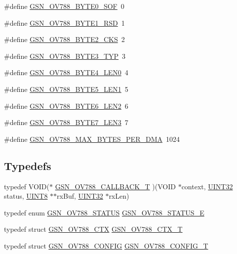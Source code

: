 \begin{DoxyCompactItemize}
\#define \hyperlink{a00537_aaa8e2c17023f689a4163090e05fb4848}{GSN\_\-OV788\_\-BYTE0\_\-SOF}~0
\item 
\#define \hyperlink{a00537_a88b389ef35586d2c4bea20e141ac2fc1}{GSN\_\-OV788\_\-BYTE1\_\-RSD}~1
\item 
\#define \hyperlink{a00537_a0e8d18eaf1c23389ea9a7de8a0e1e613}{GSN\_\-OV788\_\-BYTE2\_\-CKS}~2
\item 
\#define \hyperlink{a00537_acbed1be004ffad78affe265811ea03ce}{GSN\_\-OV788\_\-BYTE3\_\-TYP}~3
\item 
\#define \hyperlink{a00537_a8e05d473154cc480cf10794ecda8ecf5}{GSN\_\-OV788\_\-BYTE4\_\-LEN0}~4
\item 
\#define \hyperlink{a00537_a0d5b5bdc4512e025e30a7c01472efe31}{GSN\_\-OV788\_\-BYTE5\_\-LEN1}~5
\item 
\#define \hyperlink{a00537_a9e51ee53b7b2ac998aa22793436b5c4c}{GSN\_\-OV788\_\-BYTE6\_\-LEN2}~6
\item 
\#define \hyperlink{a00537_a620bfbde906f1a1960482e5bd1c65206}{GSN\_\-OV788\_\-BYTE7\_\-LEN3}~7
\item 
\#define \hyperlink{a00537_a34d25a484933f1f2e2f801ced7d31cb0}{GSN\_\-OV788\_\-MAX\_\-BYTES\_\-PER\_\-DMA}~1024
\end{DoxyCompactItemize}
\subsection*{Typedefs}
\begin{DoxyCompactItemize}
\item 
typedef VOID($\ast$ \hyperlink{a00537_aaca340fbce9b168b056214ae64de57df}{GSN\_\-OV788\_\-CALLBACK\_\-T} )(VOID $\ast$context, \hyperlink{a00660_gae1e6edbbc26d6fbc71a90190d0266018}{UINT32} status, \hyperlink{a00660_gab27e9918b538ce9d8ca692479b375b6a}{UINT8} $\ast$$\ast$rxBuf, \hyperlink{a00660_gae1e6edbbc26d6fbc71a90190d0266018}{UINT32} $\ast$rxLen)
\item 
typedef enum \hyperlink{a00537_a7c0cb78d762a84b48d1857dafbad0455}{GSN\_\-OV788\_\-STATUS} \hyperlink{a00537_ad1eec137ad450b79f2207a5a6e87d9ac}{GSN\_\-OV788\_\-STATUS\_\-E}
\item 
typedef struct \hyperlink{a00179}{GSN\_\-OV788\_\-CTX} \hyperlink{a00537_aba3a60421c8b885cc0dc9d7931274351}{GSN\_\-OV788\_\-CTX\_\-T}
\item 
typedef struct \hyperlink{a00178}{GSN\_\-OV788\_\-CONFIG} \hyperlink{a00537_a22a37c1e556e0ca8d35c488ab3589319}{GSN\_\-OV788\_\-CONFIG\_\-T}
\end{DoxyCompactItemize}

